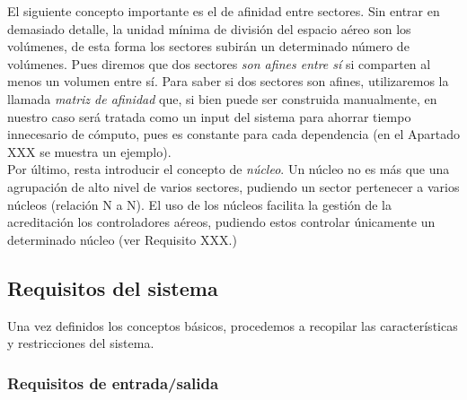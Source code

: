 El siguiente concepto importante es el de afinidad entre sectores. Sin entrar en demasiado detalle, la unidad mínima de división del espacio aéreo son los volúmenes, de esta forma los sectores subirán un determinado número de volúmenes. Pues diremos que dos sectores \textit{son afines entre sí} si comparten al menos un volumen entre sí. Para saber si dos sectores son afines, utilizaremos la llamada \textit{matriz de afinidad} que, si bien puede ser construida manualmente, en nuestro caso será tratada como un input del sistema para ahorrar tiempo innecesario de cómputo, pues es constante para cada dependencia (en el Apartado XXX se muestra un ejemplo). %
\\

Por último, resta introducir el concepto de \textit{núcleo}. Un núcleo no es más que una agrupación de alto nivel de varios sectores, pudiendo un sector pertenecer a varios núcleos (relación N a N). El uso de los núcleos facilita la gestión de la acreditación los controladores aéreos, pudiendo estos controlar únicamente un determinado núcleo (ver Requisito XXX.) %



\subsection{Requisitos del sistema}
Una vez definidos los conceptos básicos, procedemos a recopilar las características y restricciones del sistema.

\subsubsection{Requisitos de entrada/salida}

